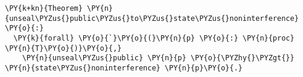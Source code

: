 \begin{BVerbatim}[commandchars=\\\{\},codes={\catcode`\$=3\catcode`\^=7\catcode`\_=8},fontsize=\footnotesize]
\PY{k+kn}{Theorem} \PY{n}{unseal\PYZus{}public\PYZus{}to\PYZus{}state\PYZus{}noninterference} \PY{o}{:}
  \PY{k}{forall} \PY{o}{`}\PY{o}{(}\PY{n}{p} \PY{o}{:} \PY{n}{proc} \PY{n}{T}\PY{o}{)}\PY{o}{,}
    \PY{n}{unseal\PYZus{}public} \PY{n}{p} \PY{o}{\PYZhy{}\PYZgt{}} \PY{n}{state\PYZus{}noninterference} \PY{n}{p}\PY{o}{.}
\end{BVerbatim}
